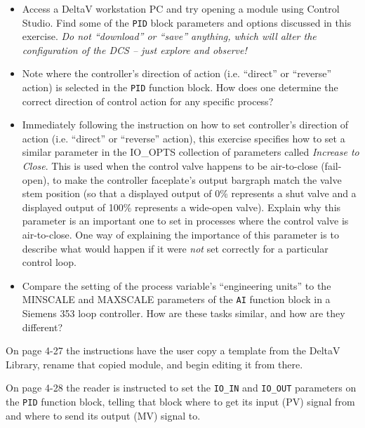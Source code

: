 \begin{itemize}
\item{} Access a DeltaV workstation PC and try opening a module using Control Studio.  Find some of the {\tt PID} block parameters and options discussed in this exercise.  {\it Do not ``download'' or ``save'' anything, which will alter the configuration of the DCS -- just explore and observe!}
\item{} Note where the controller's direction of action (i.e. ``direct'' or ``reverse'' action) is selected in the {\tt PID} function block.  How does one determine the correct direction of control action for any specific process?
\item{} Immediately following the instruction on how to set controller's direction of action (i.e. ``direct'' or ``reverse'' action), this exercise specifies how to set a similar parameter in the IO\_OPTS collection of parameters called {\it Increase to Close}.  This is used when the control valve happens to be air-to-close (fail-open), to make the controller faceplate's output bargraph match the valve stem position (so that a displayed output of 0\% represents a shut valve and a displayed output of 100\% represents a wide-open valve).  Explain why this parameter is an important one to set in processes where the control valve is air-to-close.  One way of explaining the importance of this parameter is to describe what would happen if it were {\it not} set correctly for a particular control loop.  
\item{} Compare the setting of the process variable's ``engineering units'' to the MINSCALE and MAXSCALE parameters of the {\tt AI} function block in a Siemens 353 loop controller.  How are these tasks similar, and how are they different?
\end{itemize}















On page 4-27 the instructions have the user copy a template from the DeltaV Library, rename that copied module, and begin editing it from there.

\vskip 10pt

On page 4-28 the reader is instructed to set the {\tt IO\_IN} and {\tt IO\_OUT} parameters on the {\tt PID} function block, telling that block where to get its input (PV) signal from and where to send its output (MV) signal to.




